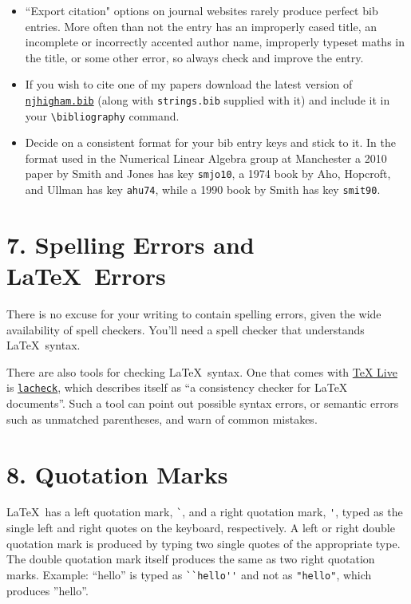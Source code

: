 \documentclass[12pt]{extarticle}
\begin{document}
\begin{itemize}
\item ``Export citation" options on journal websites rarely produce perfect bib
entries.  More often than not the entry has an improperly cased title,
an incomplete or incorrectly accented author name, improperly typeset
maths in the title, or some other error, so always check and improve
the entry.

\item If you wish to cite one of my papers download the latest version of
\href{https://github.com/higham/njhigham-bib}{\texttt{njhigham.bib}} (along with \texttt{strings.bib} supplied with it) and include it in
your \texttt{\textbackslash{}bibliography} command.

\item Decide on a consistent format for your bib entry keys and stick to it. 
In the format used in the Numerical Linear Algebra group at Manchester a
2010 paper by Smith and Jones has key \texttt{smjo10}, a 1974 book by Aho,
Hopcroft, and Ullman has key \texttt{ahu74}, while a 1990 book by Smith has key
\texttt{smit90}.
\end{itemize}

\section*{7. Spelling Errors and \LaTeX\ Errors}
\label{sec-8}
There is no excuse for your writing to contain spelling errors, given the
wide availability of spell checkers.  You'll need a spell checker that
understands \LaTeX\ syntax.

There are also tools for checking \LaTeX\ syntax.
One that comes with \href{https://www.tug.org/texlive/}{\TeX{} Live} is \href{https://www.ctan.org/tex-archive/support/lacheck?lang=en}{\texttt{lacheck}}, which describes itself as 
``a consistency checker for \LaTeX{} documents''.
Such a tool can point out possible syntax errors, or semantic errors
such as unmatched parentheses, and warn of common mistakes.

\section*{8. Quotation Marks}
\label{sec-9}
\LaTeX\ has a left quotation mark, \verb"`", and 
a right quotation mark, \verb"'", typed as the single left and right quotes on the
keyboard, respectively.
A left or right double quotation mark is produced by typing two single
quotes of the appropriate type.
The double quotation mark itself produces the same as two right quotation marks.
Example: ``hello'' is typed as \verb!``hello''! and not as
\verb!"hello"!, which produces ''hello''.
\end{document}
